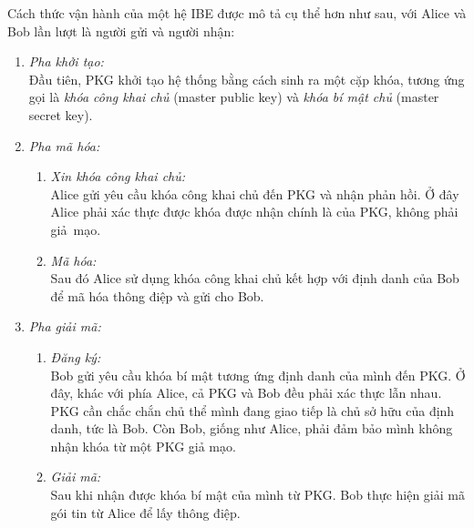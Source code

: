 \documentclass[class=report, crop=false]{standalone}
\begin{document}
		Cách thức vận hành của một hệ IBE được mô tả cụ thể hơn như sau, với Alice và Bob lần lượt là người gửi và người nhận:
		\vspace{-0.5cm}
		\begin{enumerate}
			\item \textit{Pha khởi tạo:} \\[0.2\baselineskip]
			Đầu tiên, PKG khởi tạo hệ thống bằng cách sinh ra một cặp khóa, tương ứng gọi là \textit{khóa công khai chủ} (master public key) và \textit{khóa bí mật chủ} (master secret key).
			\item \textit{Pha mã hóa:}
			\begin{enumerate}
				\item \textit{Xin khóa công khai chủ:} \\
				Alice gửi yêu cầu khóa công khai chủ đến PKG và nhận phản hồi. Ở đây Alice phải xác thực được khóa được nhận chính là của PKG, không phải giả~mạo.
				\item \textit{Mã hóa:} \\
				Sau đó Alice sử dụng khóa công khai chủ kết hợp với định danh của Bob để mã hóa thông điệp và gửi cho Bob.
			\end{enumerate}
			\item \textit{Pha giải mã:}
			\begin{enumerate}
				\item \textit{Đăng ký:} \\
				Bob gửi yêu cầu khóa bí mật tương ứng định danh của mình đến PKG. Ở đây, khác với phía Alice, cả PKG và Bob đều phải xác thực lẫn nhau. PKG cần chắc chắn chủ thể mình đang giao tiếp là chủ sở hữu của định danh, tức là Bob. Còn Bob, giống như Alice, phải đảm bảo mình không nhận khóa từ một PKG giả mạo.
				\item \textit{Giải mã:} \\
				Sau khi nhận được khóa bí mật của mình từ PKG. Bob thực hiện giải mã gói tin từ Alice để lấy thông điệp.
			\end{enumerate}
		\end{enumerate}
		
\end{document}
